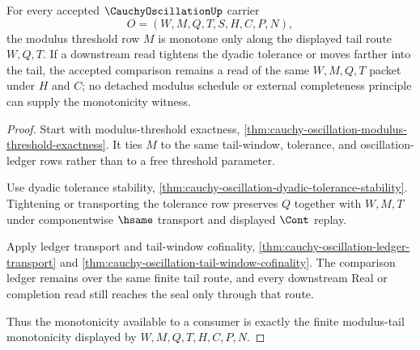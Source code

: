 \begin{theorem}
\label{thm:cauchy-oscillation-modulus-tail-monotonicity}
For every accepted $\CauchyOscillationUp$ carrier
$$
O=(W,M,Q,T,S,H,C,P,N),
$$
the modulus threshold row $M$ is monotone only along the displayed tail route $W,Q,T$. If a downstream read tightens the dyadic tolerance or moves farther into the tail, the accepted comparison remains a read of the same $W,M,Q,T$ packet under $H$ and $C$; no detached modulus schedule or external completeness principle can supply the monotonicity witness.
\end{theorem}
\begin{proof}
Start with modulus-threshold exactness, \autoref{thm:cauchy-oscillation-modulus-threshold-exactness}. It ties $M$ to the same tail-window, tolerance, and oscillation-ledger rows rather than to a free threshold parameter.

Use dyadic tolerance stability, \autoref{thm:cauchy-oscillation-dyadic-tolerance-stability}. Tightening or transporting the tolerance row preserves $Q$ together with $W,M,T$ under componentwise $\hsame$ transport and displayed $\Cont$ replay.

Apply ledger transport and tail-window cofinality, \autoref{thm:cauchy-oscillation-ledger-transport} and \autoref{thm:cauchy-oscillation-tail-window-cofinality}. The comparison ledger remains over the same finite tail route, and every downstream Real or completion read still reaches the seal only through that route.

Thus the monotonicity available to a consumer is exactly the finite modulus-tail monotonicity displayed by $W,M,Q,T,H,C,P,N$.
\end{proof}

